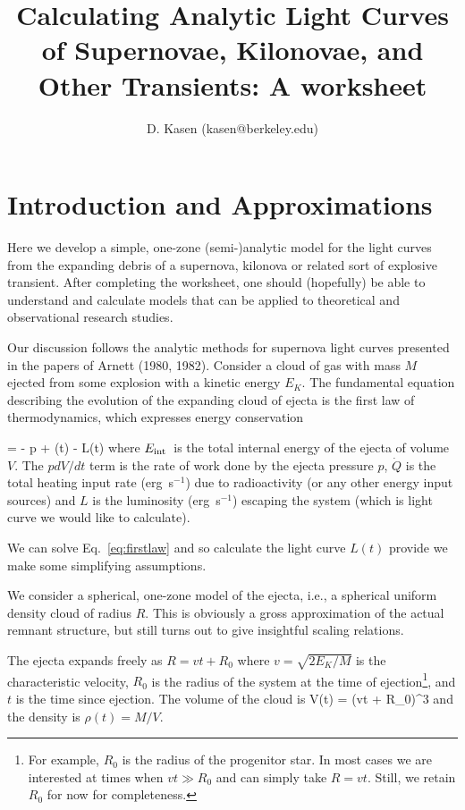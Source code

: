 \documentclass{tufte-handout}
\title{Calculating Analytic Light Curves of Supernovae, Kilonovae, and Other Transients: A worksheet}
\author{D. Kasen (kasen@berkeley.edu)}
\date{}
\newcommand{\Eint}{\ensuremath{E_{\rm int}}}
\begin{document}
\maketitle

\setcounter{quest}{0}


\section{Introduction and Approximations}

Here we develop a simple, one-zone (semi-)analytic model for the light curves
from the expanding debris of a supernova, kilonova or related sort of explosive transient.
After completing the worksheet, one should (hopefully) be able to understand and calculate models that can be applied to theoretical and observational research studies.

 Our discussion
follows the analytic methods
for supernova light curves presented in the  papers of
Arnett (1980, 1982).
Consider a cloud of gas with mass $M$ ejected from some explosion with
a  kinetic energy $E_K$.  The fundamental equation
describing the evolution of the expanding cloud of ejecta is the first law of
thermodynamics, which expresses energy conservation

\beq
\od{\Eint(t)}{t} = - p  + (t) - L(t)
\label{eq:firstlaw}
\eeq
where \Eint\ is the total internal energy of the ejecta of volume $V$. The $p dV/dt$
term is the rate of work done
by the ejecta pressure $p$, $\dot{Q}$ is the total heating input rate (erg~s$^{-1}$) due to radioactivity (or any other energy input sources) and $L$ is the  
luminosity (erg~s$^{-1}$) escaping the system (which is light curve we would like to calculate).


We can solve Eq.~\ref{eq:firstlaw} and so calculate the light curve $L(t)$ provide we make some simplifying assumptions.

 We consider a spherical, one-zone model of the ejecta, i.e.,
a spherical uniform density cloud of radius $R$. This is obviously a gross approximation
of the actual remnant structure, but still turns out to give
insightful scaling relations.

 The ejecta  expands freely as $R = v t + R_0$ where
$v = \sqrt{2E_K/M}$ is the characteristic velocity, $R_0$ is the radius of the system
at the time of ejection\footnote{For example, $R_0$ is the radius of the progenitor star. In most cases  we are interested at times when $v t \gg R_0$ and can simply
take $R = vt$. Still, we retain  $R_0$ for now for completeness.}, and $t$ is the time since
ejection.  The volume of the cloud is 
\beq
V(t)  =  (vt + R_0)^3
\eeq
and the density is $\rho(t) = M/V$.
\end{document}
